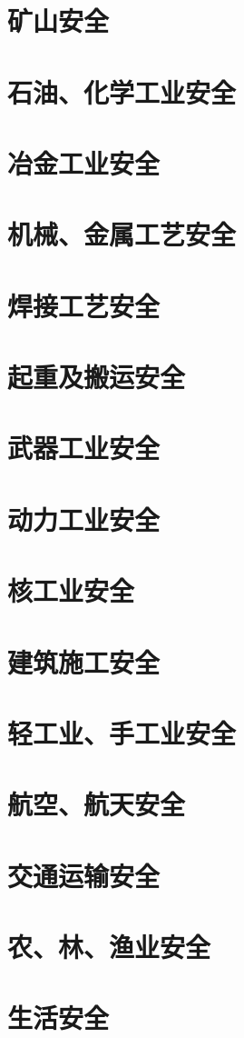 \documentclass[UTF8]{../ApplicationUniverse}
\begin{document}
\section{矿山安全}
\section{石油、化学工业安全}
\section{冶金工业安全}
\section{机械、金属工艺安全}
\section{焊接工艺安全}
\section{起重及搬运安全}
\section{武器工业安全}
\section{动力工业安全}
\section{核工业安全}
\section{建筑施工安全}
\section{轻工业、手工业安全}
\section{航空、航天安全}
\section{交通运输安全}
\section{农、林、渔业安全}
\section{生活安全}
\end{document}
